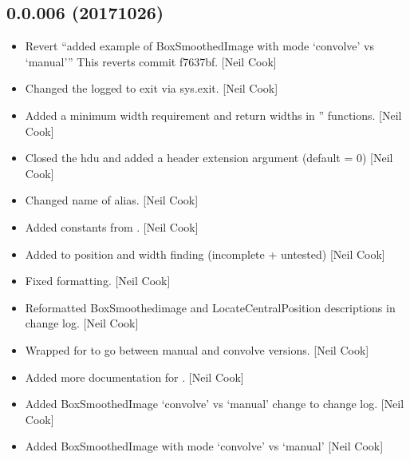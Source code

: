 \documentclass[a4paper,10pt,english]{report}
\begin{document}
\subsection{0.0.006 (2017\sphinxhyphen{}10\sphinxhyphen{}26)}
\label{\detokenize{misc/changelog:id564}}\begin{itemize}
\item {} 
Revert “added example of BoxSmoothedImage with mode ‘convolve’ vs
‘manual’” This reverts commit f7637bf. {[}Neil Cook{]}

\item {} 
Changed the logged to exit via sys.exit. {[}Neil Cook{]}

\item {} 
Added a minimum width requirement and return widths in
” functions. {[}Neil Cook{]}

\item {} 
Closed the hdu and added a header extension argument (default = 0)
{[}Neil Cook{]}

\item {} 
Changed name of  alias. {[}Neil Cook{]}

\item {} 
Added constants from . {[}Neil Cook{]}

\item {} 
Added to position and width finding (incomplete + untested) {[}Neil
Cook{]}

\item {} 
Fixed formatting. {[}Neil Cook{]}

\item {} 
Reformatted BoxSmoothedimage and LocateCentralPosition descriptions in
change log. {[}Neil Cook{]}

\item {} 
Wrapped for  to go between manual and convolve
versions. {[}Neil Cook{]}

\item {} 
Added more documentation for . {[}Neil Cook{]}

\item {} 
Added BoxSmoothedImage ‘convolve’ vs ‘manual’ change to change log.
{[}Neil Cook{]}

\item {} 
Added BoxSmoothedImage with mode ‘convolve’ vs ‘manual’ {[}Neil Cook{]}

\end{itemize}
\end{document}
